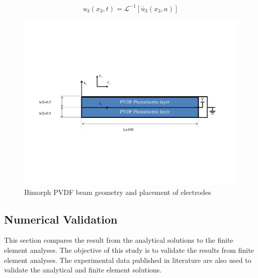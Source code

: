 \begin{equation}
u_3(x_3,t) =\mathcal{L}^{-1} \left[ \bar{u}_3(x_3,a) \right]
\label{eqn:inverse_laplace_of_transverse_displace_ment}
\end{equation}

\begin{figure}
\centering
\includegraphics[width=6.0in]{./chap_4_structural_analyses/pdf_beam/bimorph_PVDF_beam_geometry.pdf}
\caption{Bimorph PVDF beam geometry and placement of electrodes}
\label{fig:bimorph_PVDF_beam_geometry}
\end{figure}

\subsection{Numerical Validation}
This section compares the result from the analytical solutions to the finite element analyses.
The objective of this study is to validate the results from finite element analyses.
The experimental data published in literature are also used to validate the analytical and finite element solutions.

